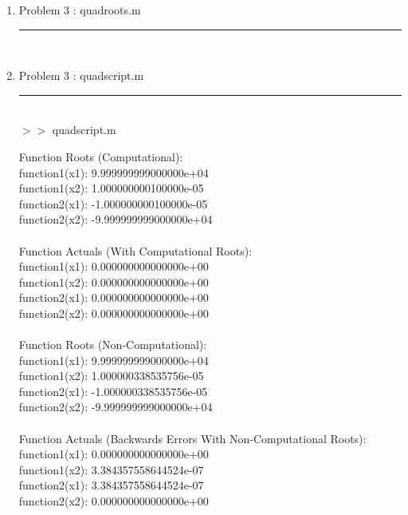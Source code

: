 \documentclass[12pt]{article}
\begin{document}
	\begin{enumerate}
	\item[] Problem 3 : quadroots.m \noindent\rule{\textwidth}{1.0pt} \\
		
	
		\item[] Problem 3 : quadscript.m \noindent\rule{\textwidth}{1.0pt} \\
		
		
	$>>$ quadscript.m
	\begin{framed}
		Function Roots (Computational):\\
function1(x1): 9.999999999000000e+04\\
function1(x2): 1.000000000100000e-05\\
function2(x1): -1.000000000100000e-05\\
function2(x2): -9.999999999000000e+04\\
\\
Function Actuals (With Computational Roots):\\
function1(x1): 0.000000000000000e+00\\
function1(x2): 0.000000000000000e+00\\
function2(x1): 0.000000000000000e+00\\
function2(x2): 0.000000000000000e+00\\
\\
Function Roots (Non-Computational):\\
function1(x1): 9.999999999000000e+04\\
function1(x2): 1.000000338535756e-05\\
function2(x1): -1.000000338535756e-05\\
function2(x2): -9.999999999000000e+04\\
\\
Function Actuals (Backwards Errors With Non-Computational Roots):\\
function1(x1): 0.000000000000000e+00\\
function1(x2): 3.384357558644524e-07\\
function2(x1): 3.384357558644524e-07\\
function2(x2): 0.000000000000000e+00\\
	\end{framed}	
	
	\end{enumerate}
\end{document}

